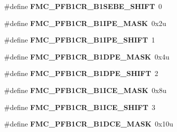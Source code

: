 \begin{DoxyCompactItemize}
\item 
\#define {\bfseries F\+M\+C\+\_\+\+P\+F\+B1\+C\+R\+\_\+\+B1\+S\+E\+B\+E\+\_\+\+S\+H\+I\+FT}~0\hypertarget{group__FMC__Register__Masks_ga8666915cae16d07904756da796935f3c}{}\label{group__FMC__Register__Masks_ga8666915cae16d07904756da796935f3c}

\item 
\#define {\bfseries F\+M\+C\+\_\+\+P\+F\+B1\+C\+R\+\_\+\+B1\+I\+P\+E\+\_\+\+M\+A\+SK}~0x2u\hypertarget{group__FMC__Register__Masks_ga282ed00b64bb32336610c04d1404e86d}{}\label{group__FMC__Register__Masks_ga282ed00b64bb32336610c04d1404e86d}

\item 
\#define {\bfseries F\+M\+C\+\_\+\+P\+F\+B1\+C\+R\+\_\+\+B1\+I\+P\+E\+\_\+\+S\+H\+I\+FT}~1\hypertarget{group__FMC__Register__Masks_ga6685876e76f4ea584622a68f6bea6b56}{}\label{group__FMC__Register__Masks_ga6685876e76f4ea584622a68f6bea6b56}

\item 
\#define {\bfseries F\+M\+C\+\_\+\+P\+F\+B1\+C\+R\+\_\+\+B1\+D\+P\+E\+\_\+\+M\+A\+SK}~0x4u\hypertarget{group__FMC__Register__Masks_gad8ceabcc8b8c9f94ac2216c3bf87f3af}{}\label{group__FMC__Register__Masks_gad8ceabcc8b8c9f94ac2216c3bf87f3af}

\item 
\#define {\bfseries F\+M\+C\+\_\+\+P\+F\+B1\+C\+R\+\_\+\+B1\+D\+P\+E\+\_\+\+S\+H\+I\+FT}~2\hypertarget{group__FMC__Register__Masks_ga9a6d2f7bfce24b100a34731744602db7}{}\label{group__FMC__Register__Masks_ga9a6d2f7bfce24b100a34731744602db7}

\item 
\#define {\bfseries F\+M\+C\+\_\+\+P\+F\+B1\+C\+R\+\_\+\+B1\+I\+C\+E\+\_\+\+M\+A\+SK}~0x8u\hypertarget{group__FMC__Register__Masks_ga54e7a000de93d88f2b6287e197890347}{}\label{group__FMC__Register__Masks_ga54e7a000de93d88f2b6287e197890347}

\item 
\#define {\bfseries F\+M\+C\+\_\+\+P\+F\+B1\+C\+R\+\_\+\+B1\+I\+C\+E\+\_\+\+S\+H\+I\+FT}~3\hypertarget{group__FMC__Register__Masks_gab0d831cd340d45b11c048d8a51bb9e15}{}\label{group__FMC__Register__Masks_gab0d831cd340d45b11c048d8a51bb9e15}

\item 
\#define {\bfseries F\+M\+C\+\_\+\+P\+F\+B1\+C\+R\+\_\+\+B1\+D\+C\+E\+\_\+\+M\+A\+SK}~0x10u\hypertarget{group__FMC__Register__Masks_gaa101cb7bed362dfe0e710d0215b4b150}{}\label{group__FMC__Register__Masks_gaa101cb7bed362dfe0e710d0215b4b150}


\end{DoxyCompactItemize}
